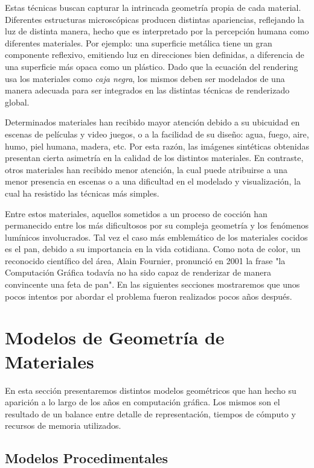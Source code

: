 \documentclass[spanish,a4paper,11pt,oneside,links]{report}
\begin{document}
Estas técnicas buscan capturar la intrincada geometría propia de cada material. Diferentes estructuras microscópicas producen distintas apariencias, reflejando la luz de distinta manera, hecho que es interpretado por la percepción humana como diferentes materiales. Por ejemplo: una superficie metálica tiene un gran componente reflexivo, emitiendo luz en direcciones bien definidas, a diferencia de una superficie más opaca como un plástico. Dado que la ecuación del rendering usa los materiales como {\em caja negra}, los mismos deben ser modelados de una manera adecuada para ser integrados en las distintas técnicas de renderizado global.

Determinados materiales han recibido mayor atención debido a su ubicuidad en escenas de películas y video juegos, o a la facilidad de su diseño: agua, fuego, aire, humo, piel humana, madera, etc. Por esta razón, las imágenes sintéticas obtenidas presentan cierta asimetría en la calidad de los distintos materiales. En contraste, otros materiales han recibido menor atención, la cual puede atribuirse a una menor presencia en escenas o a una dificultad en el modelado y visualización, la cual ha resistido las técnicas más simples.

Entre estos materiales, aquellos sometidos a un proceso de cocción han permanecido entre los más dificultosos por su compleja geometría y los fenómenos lumínicos involucrados. Tal vez el caso más emblemático de los materiales cocidos es el pan, debido a su importancia en la vida cotidiana. Como nota de color, un reconocido  científico del área, Alain Fournier, pronunció en 2001 la frase "la Computación Gráfica todavía no ha sido capaz de renderizar de manera convincente una feta de pan". En las siguientes secciones mostraremos que unos pocos intentos por abordar el problema fueron realizados pocos años después.

\section{Modelos de Geometría de Materiales}
En esta sección presentaremos distintos modelos geométricos que han hecho su aparición a lo largo de los años en computación gráfica. Los mismos son el resultado de un balance entre detalle de representación, tiempos de cómputo y recursos de memoria utilizados.

\subsection{Modelos Procedimentales}
\end{document}
